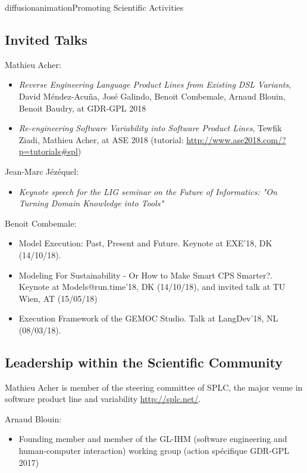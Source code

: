 \documentclass{ra2018}
\begin{document}
\begin{module}{diffusion}{animation}{Promoting Scientific Activities}
    
\subsection{Invited Talks}
Mathieu Acher:
\begin{itemize}
	\item \emph{Reverse Engineering Language Product Lines from Existing DSL Variants}, David Méndez-Acuña, José Galindo, Benoit Combemale, Arnaud Blouin, Benoit Baudry, at GDR-GPL 2018

	\item \emph{Re-engineering Software Variability into Software Product Lines}, Tewfik Ziadi, Mathieu Acher, at ASE 2018 (tutorial: \url{http://www.ase2018.com/?p=tutorials#spl})
\end{itemize}

Jean-Marc J\'ez\'equel:
\begin{itemize}
	\item \emph{Keynote speech for the LIG seminar on the Future of Informatics: "On  Turning Domain Knowledge into Tools"}
\end{itemize}

Benoit Combemale: 
\begin{itemize}
	\item Model Execution: Past, Present and Future. Keynote at EXE’18, DK (14/10/18).
	\item Modeling For Sustainability - Or How to Make Smart CPS Smarter?. Keynote at Models@run.time’18, DK (14/10/18), and invited talk at TU Wien, AT (15/05/18)
	\item Execution Framework of the GEMOC Studio. Talk at LangDev’18, NL (08/03/18).
\end{itemize}


\subsection{Leadership within the Scientific Community}

Mathieu Acher is member of the steering committee of SPLC, the major venue in software product line and variability \url{http://splc.net/}.

\noindent Arnaud Blouin:
\begin{itemize}
	\item Founding member and member of the GL-IHM (software engineering and human-computer interaction) working group (action spécifique GDR-GPL 2017)
\end{itemize}



\end{module}
\end{document}
